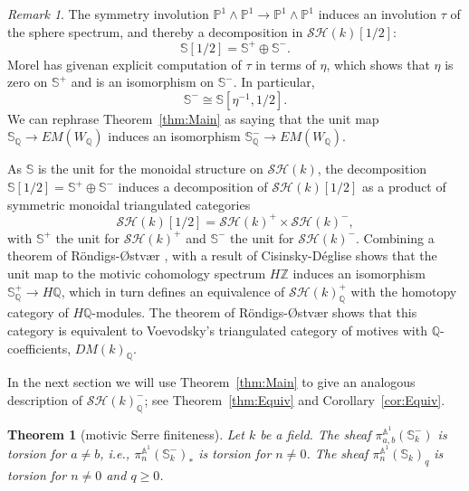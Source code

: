 \documentclass[a4paper,12pt,draft]{amsart}
\newtheorem{theorem}{Theorem}
\theoremstyle{definition}
\theoremstyle{remark}
\newtheorem{remark}{Remark}
\begin{document}
\begin{remark} The symmetry involution ${{\mathbb P}}^1\wedge{{\mathbb P}}^1\to {{\mathbb P}}^1\wedge {{\mathbb P}}^1$ induces an involution $\tau$ of the sphere spectrum, and thereby a decomposition in ${\mathcal{SH}}(k)[1/2]$:
\[
 \mathbb{S}[1/2]= \mathbb{S}^+\oplus \mathbb{S}^-.
 \]
 Morel has givenan explicit computation of $\tau$ in terms of $\eta$, which shows that $\eta$ is zero on $ \mathbb{S}^+$ and is an isomorphism on $\mathbb{S}^-$. In particular, 
 \[
 \mathbb{S}^-\cong  \mathbb{S}[\eta^{-1},1/2].
 \]
We can rephrase Theorem~\ref{thm:Main} as saying that the unit map $\mathbb{S}_{{\mathbb Q}}\to EM(W_{{\mathbb Q}})$ induces an isomorphism   $\mathbb{S}^-_{{\mathbb Q}}\to EM(W_{{\mathbb Q}})$.

As $\mathbb{S}$ is the unit for the monoidal structure on ${\mathcal{SH}}(k)$, the decomposition $ \mathbb{S}[1/2]= \mathbb{S}^+\oplus \mathbb{S}^-$ induces a decomposition of ${\mathcal{SH}}(k)[1/2]$ as a product of symmetric monoidal triangulated categories
\[
{\mathcal{SH}}(k)[1/2]={\mathcal{SH}}(k)^+\times {\mathcal{SH}}(k)^-,
\]
with $ \mathbb{S}^+$ the unit for ${\mathcal{SH}}(k)^+$ and $ \mathbb{S}^-$ the unit for ${\mathcal{SH}}(k)^-$. Combining a theorem of R\"ondigs-{\O}stv{\ae}r \cite[Theorem 1.1]{RO}, with a result of Cisinsky-D\'eglise \cite[Theorem 16.2.13]{CD} shows that the unit map to the motivic cohomology spectrum $H{{\mathbb Z}}$ induces an isomorphism $\mathbb{S}^+_{{\mathbb Q}}\to H{{\mathbb Q}}$, which in turn defines an equivalence of ${\mathcal{SH}}(k)^+_{{\mathbb Q}}$ with the homotopy category of $H{{\mathbb Q}}$-modules. The theorem of R\"ondigs-{\O}stv{\ae}r shows that this category is equivalent to Voevodsky's triangulated category of motives with ${{\mathbb Q}}$-coefficients, $DM(k)_{{\mathbb Q}}$.

In the next section we will use Theorem~\ref{thm:Main}  to give an analogous description of   ${\mathcal{SH}}(k)_{{\mathbb Q}}^-$; see Theorem~\ref{thm:Equiv}  and Corollary~\ref{cor:Equiv}.
\end{remark}

\begin{theorem}[motivic Serre finiteness]\label{thm:SFinite} Let $k$ be a field. The  sheaf $\pi^{{{\mathbb A}}^1}_{a,b}(\mathbb{S}^-_k)$ is torsion for $a\neq b$, i.e., $\pi^{{{\mathbb A}}^1}_n(\mathbb{S}^-_k)_*$ is torsion for $n\neq0$. The
 sheaf $\pi^{{{\mathbb A}}^1}_n(\mathbb{S}_k)_q$ is torsion for  $n\neq0$ and $q\ge0$.
\end{theorem}
\end{document}
